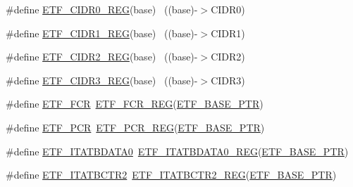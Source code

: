 \begin{DoxyCompactItemize}
\item 
\#define \hyperlink{group___e_t_f___register___accessor___macros_gab4e786e2f33bbea0b33fd3250cdb2499}{E\+T\+F\+\_\+\+C\+I\+D\+R0\+\_\+\+R\+EG}(base)                                        ~((base)-\/$>$C\+I\+D\+R0)
\item 
\#define \hyperlink{group___e_t_f___register___accessor___macros_gaf70f578ef4ae9dc6d0d1e27c3b57d0f2}{E\+T\+F\+\_\+\+C\+I\+D\+R1\+\_\+\+R\+EG}(base)                                        ~((base)-\/$>$C\+I\+D\+R1)
\item 
\#define \hyperlink{group___e_t_f___register___accessor___macros_gacbbd3a362f90d06779e066903034ea6f}{E\+T\+F\+\_\+\+C\+I\+D\+R2\+\_\+\+R\+EG}(base)                                        ~((base)-\/$>$C\+I\+D\+R2)
\item 
\#define \hyperlink{group___e_t_f___register___accessor___macros_ga30f319179915e151dc415ba158aea9bf}{E\+T\+F\+\_\+\+C\+I\+D\+R3\+\_\+\+R\+EG}(base)                                        ~((base)-\/$>$C\+I\+D\+R3)
\item 
\#define \hyperlink{group___e_t_f___register___accessor___macros_ga5ddd46da8c2006023383bbb35d1e8729}{E\+T\+F\+\_\+\+F\+CR}~\hyperlink{group___e_t_f___register___accessor___macros_ga3a6090c96a97fedec3eecc70692c9281}{E\+T\+F\+\_\+\+F\+C\+R\+\_\+\+R\+EG}(\hyperlink{group___e_t_f___peripheral_ga46da3f879a5311a0651d7908021daa5e}{E\+T\+F\+\_\+\+B\+A\+S\+E\+\_\+\+P\+TR})
\item 
\#define \hyperlink{group___e_t_f___register___accessor___macros_ga38f9c7ef7629c226823af6d743946b9d}{E\+T\+F\+\_\+\+P\+CR}~\hyperlink{group___e_t_f___register___accessor___macros_ga7f09a0cf0ce3ad36eaebb2ece85082bb}{E\+T\+F\+\_\+\+P\+C\+R\+\_\+\+R\+EG}(\hyperlink{group___e_t_f___peripheral_ga46da3f879a5311a0651d7908021daa5e}{E\+T\+F\+\_\+\+B\+A\+S\+E\+\_\+\+P\+TR})
\item 
\#define \hyperlink{group___e_t_f___register___accessor___macros_ga776e8e2e77df0f3d95797094ae440fba}{E\+T\+F\+\_\+\+I\+T\+A\+T\+B\+D\+A\+T\+A0}~\hyperlink{group___e_t_f___register___accessor___macros_ga86a704f3527d5df411f99ec8f9676d3d}{E\+T\+F\+\_\+\+I\+T\+A\+T\+B\+D\+A\+T\+A0\+\_\+\+R\+EG}(\hyperlink{group___e_t_f___peripheral_ga46da3f879a5311a0651d7908021daa5e}{E\+T\+F\+\_\+\+B\+A\+S\+E\+\_\+\+P\+TR})
\item 
\#define \hyperlink{group___e_t_f___register___accessor___macros_ga3725c13fdb2033c92131c8abf3367aa1}{E\+T\+F\+\_\+\+I\+T\+A\+T\+B\+C\+T\+R2}~\hyperlink{group___e_t_f___register___accessor___macros_gaa9b800e446803bbceb31252ffb731292}{E\+T\+F\+\_\+\+I\+T\+A\+T\+B\+C\+T\+R2\+\_\+\+R\+EG}(\hyperlink{group___e_t_f___peripheral_ga46da3f879a5311a0651d7908021daa5e}{E\+T\+F\+\_\+\+B\+A\+S\+E\+\_\+\+P\+TR})

\end{DoxyCompactItemize}
